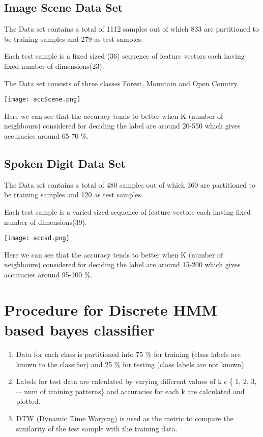 \documentclass[a4paper]{article}
\begin{document}
     \subsection{Image Scene Data Set} 
     
	
	\indent \par{	The Data set contains a total of 1112 samples out of which 833 are partitioned to be training samples and 279 as test samples.}
        \par{Each test sample is a fixed sized (36) sequence of feature vectors each having fixed number of dimensions(23).}
      	\par{The Data set consists of three classes Forest, Mountain and Open Country.} 
        
     \texttt{[image: accScene.png]}
     	
        
        
        Here we can see that the accuracy tends to better when K (number of neighbours) considered for deciding the label are around 20-550 which gives accuracies around 65-70 \%.
 \subsection{Spoken Digit Data Set} 
       
       \indent \par{	The Data set contains a total of 480 samples out of which 360 are partitioned to be training samples and 120 as test samples.}
        \par{Each test sample is a varied sized sequence of feature vectors each having fixed number of dimensions(39).}
      	      
       \texttt{[image: accsd.png]}
     	
        
        
              Here we can see that the accuracy tends to better when K (number of neighbours) considered for deciding the label are around 15-200 which gives accuracies around 95-100 \%.
         

\section{Procedure for Discrete HMM based bayes classifier}
	\begin{enumerate}
	  \item {Data for each class is partitioned into 75 \% for training (class labels are known to the classifier) and 25 \% for testing (class labels are not known)}
     \item {Labels for test data are calculated by varying different values of k $\epsilon$ \{ 1, 2, 3, $\cdots$ num of training patterns\} and accuracies for each k are calculated and plotted.}
     \item {
      DTW (Dynamic Time Warping) is used as the metric to compare the similarity of the test sample with the training data.     
     }
	 
	\end{enumerate}
\end{document}

